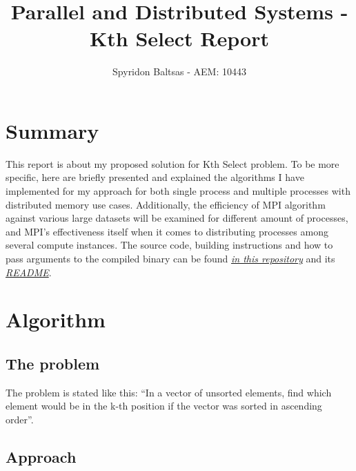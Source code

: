 \documentclass[11pt]{article}
\author{Spyridon Baltsas - AEM: 10443}
\date{}
\title{Parallel and Distributed Systems - Kth Select Report}
\begin{document}
\maketitle

\section{Summary}
\label{sec:org17195b2}
This report is about my proposed solution for Kth Select problem. To be more specific, here are briefly presented and explained the algorithms I have implemented for my approach for both single process and multiple processes with distributed memory use cases. Additionally, the efficiency of MPI algorithm against various large datasets will be examined for different amount of processes, and MPI's effectiveness itself when it comes to distributing processes among several compute instances. The source code, building instructions and how to pass arguments to the compiled binary can be found \href{https://github.com/thetonk/pds-solutions/tree/main/Kth\%20Select}{\emph{in this repository}} and its \href{https://github.com/thetonk/pds-solutions/blob/main/Kth\%20Select/README.md}{\emph{README}}.

\section{Algorithm}
\label{sec:orga8ebf0e}
\subsection{The problem}
\label{sec:org7b1bcfd}
The problem is stated like this: ``In a vector of unsorted elements, find which element would be in the k-th position if the vector was sorted in ascending order''.
\subsection{Approach}
\label{sec:org17cddb6}
\end{document}
